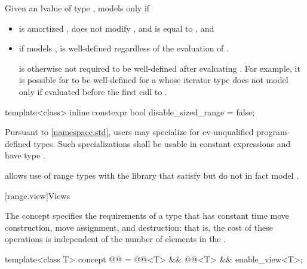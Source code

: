 \begin{itemdescr}
\pnum
Given an lvalue  of type , 
models  only if
\begin{itemize}
\item {} is amortized , does not modify ,
and is equal to , and

\item if  models ,
 is well-defined regardless of the evaluation of
.
\begin{note}
 is otherwise not required to be
well-defined after evaluating .
For example, it is possible for  to be well-defined
for a  whose iterator type
does not model 
only if evaluated before the first call to .
\end{note}
\end{itemize}
\end{itemdescr}

%
\begin{itemdecl}
template<class>
  inline constexpr bool disable_sized_range = false;
\end{itemdecl}

\begin{itemdescr}
\pnum
\remarks
Pursuant to \ref{namespace.std},
users may specialize 
for cv-unqualified program-defined types.
Such specializations shall
be usable in constant expressions and
have type .

\pnum
\begin{note}
 allows use of range types with the library
that satisfy but do not in fact model .
\end{note}
\end{itemdescr}

[range.view]{Views}

\pnum
The  concept specifies the requirements of a  type
that has constant time move construction, move assignment, and destruction;
that is, the cost of these operations is
independent of the number of elements in the .

\begin{itemdecl}
template<class T>
  concept @@ =
    @@<T> && @@<T> && enable_view<T>;
\end{itemdecl}

